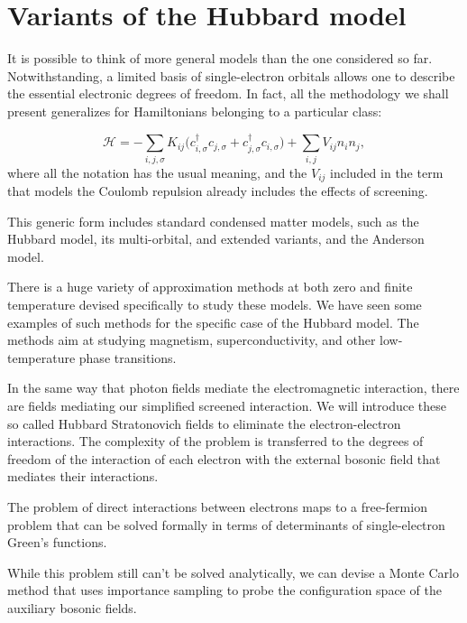\section{Variants of the Hubbard model}\label{sec:variants}

It is possible to think of more general  models than the one considered so far.
Notwithstanding, a limited basis of single-electron orbitals allows one to describe the essential electronic degrees of freedom.
In fact, all the methodology we shall present generalizes for Hamiltonians belonging to a particular class:

\begin{equation}
\mathcal{H} = - \sum_{i, j, \sigma} K_{ij} \bigg( c_{i, \sigma}^\dagger c_{j, \sigma} + c_{j, \sigma}^\dagger c_{i, \sigma} \bigg) + \sum_{i, j} V_{ij} n_i n_j ,
\end{equation}
where all the notation has the usual meaning, and the $V_{ij}$ included in the term that models the Coulomb repulsion already includes the effects of screening.

This generic form includes standard condensed matter models, such as the Hubbard model, its multi-orbital, and extended variants, and the Anderson model.

There is a huge variety of approximation methods at both zero and finite temperature devised specifically to study these models.
We have seen some examples of such methods for the specific case of the Hubbard model.
The methods aim at studying magnetism, superconductivity, and other low-temperature phase transitions.

\bigskip

In the same way that photon fields mediate the electromagnetic interaction, there are fields mediating our simplified screened interaction.
We will introduce these so called Hubbard Stratonovich fields to eliminate the electron-electron interactions.
The complexity of the problem is transferred to the degrees of freedom of the interaction of each electron with the external bosonic field that mediates their interactions.

The problem of direct interactions between electrons maps to a free-fermion problem that can be solved formally in terms of determinants of single-electron Green's functions.

While this problem still can't be solved analytically, we can devise a Monte Carlo method that uses importance sampling to probe the configuration space of the auxiliary bosonic fields.